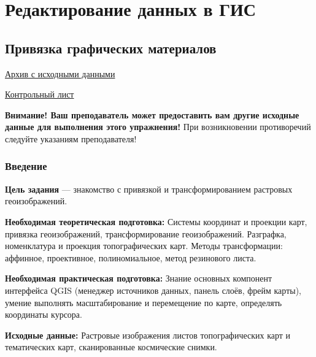 \documentclass[
  12pt,
]{book}
\begin{document}
\hypertarget{part-ux440ux435ux434ux430ux43aux442ux438ux440ux43eux432ux430ux43dux438ux435-ux434ux430ux43dux43dux44bux445-ux432-ux433ux438ux441}{%
\part{Редактирование данных в ГИС}\label{part-ux440ux435ux434ux430ux43aux442ux438ux440ux43eux432ux430ux43dux438ux435-ux434ux430ux43dux43dux44bux445-ux432-ux433ux438ux441}}

\hypertarget{raster-reference}{%
\chapter{Привязка графических материалов}\label{raster-reference}}

\href{https://github.com/aentin/qgis-course/raw/a65b77c3a8f3f122015846502ec8d0c76615f945/files/Ex05.zip}{Архив с исходными данными}

\href{https://github.com/aentin/qgis-course/raw/a65b77c3a8f3f122015846502ec8d0c76615f945/files/Ex05_\%D0\%BE\%D1\%82\%D1\%87\%D1\%91\%D1\%82.docx}{Контрольный лист}

\textbf{Внимание! Ваш преподаватель может предоставить вам другие исходные данные для выполнения этого упражнения!} При возникновении противоречий следуйте указаниям преподавателя!

\hypertarget{raster-reference-intro}{%
\section{Введение}\label{raster-reference-intro}}

\textbf{Цель задания} --- знакомство с привязкой и трансформированием растровых геоизображений.

\textbf{Необходимая теоретическая подготовка:} Системы координат и проекции карт, привязка геоизображений, трансформирование геоизображений. Разграфка, номенклатура и проекция топографических карт. Методы трансформации: аффинное, проективное, полиномиальное, метод резинового листа.

\textbf{Необходимая практическая подготовка:} Знание основных компонент интерфейса QGIS (менеджер источников данных, панель слоёв, фрейм карты), умение выполнять масштабирование и перемещение по карте, определять координаты курсора.

\textbf{Исходные данные:} Растровые изображения листов топографических карт и тематических карт, сканированные космические снимки.
\end{document}
